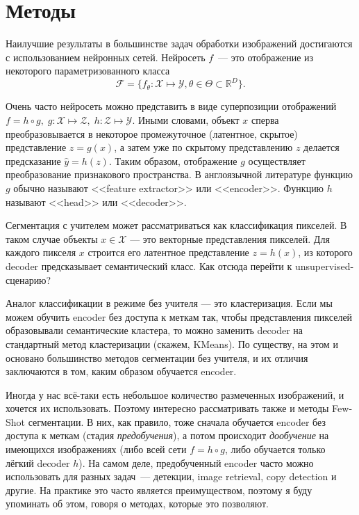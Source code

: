 \section{Методы}

Наилучшие результаты в большинстве задач обработки изображений достигаются с использованием нейронных сетей.
Нейросеть $f$~--- это отображение из некоторого параметризованного класса 
\begin{equation}
    \mathcal{F} = \{f_\theta \colon \mathcal{X} \mapsto \mathcal{Y}, \theta \in \Theta \subset \mathbb{R}^D\}.
\end{equation}

Очень часто нейросеть можно представить в виде суперпозиции отображений
$f = h \circ g, \; g \colon \mathcal{X} \mapsto \mathcal{Z}, \; h\colon \mathcal{Z} \mapsto \mathcal{Y}$.
Иными словами, объект $x$ сперва преобразовывается в некоторое промежуточное (латентное, скрытое) представление $z = g(x)$,
а затем уже по скрытому представлению $z$ делается предсказание $\hat{y} = h(z)$.
Таким образом, отображение $g$ осуществляет преобразование признакового пространства.
В англоязычной литературе функцию $g$ обычно называют <<feature extractor>> или <<encoder>>.
Функцию $h$ называют <<head>> или <<decoder>>.

Сегментация с учителем может рассматриваться как классификация пикселей.
В таком случае объекты $x \in \mathcal{X}$ --- это векторные представления пикселей.
Для каждого пикселя $x$ строится его латентное представление $z = h(x)$, из которого decoder предсказывает семантический класс.
Как отсюда перейти к unsupervised-сценарию? 

Аналог классификации в режиме без учителя --- это кластеризация.
Если мы можем обучить encoder без доступа к меткам так, чтобы представления пикселей образовывали семантические кластера,
то можно заменить decoder на стандартный метод кластеризации (скажем, KMeans).
По существу, на этом и основано большинство методов сегментации без учителя,
и их отличия заключаются в том, каким образом обучается encoder.

Иногда у нас всё-таки есть небольшое количество размеченных изображений, и хочется их использовать.
Поэтому интересно рассматривать также и методы Few-Shot сегментации.
В них, как правило, тоже сначала обучается encoder без доступа к меткам (стадия \textit{предобучения}), а потом происходит 
\textit{дообучение} на имеющихся изображениях (либо всей сети $f = h \circ g$, либо обучается только лёгкий decoder $h$).
На самом деле, предобученный encoder часто можно использовать для разных задач~--- детекции, image retrieval, copy detection и другие.
На практике это часто является преимуществом, поэтому я буду упоминать об этом, говоря о методах, которые это позволяют.
\bigskip

